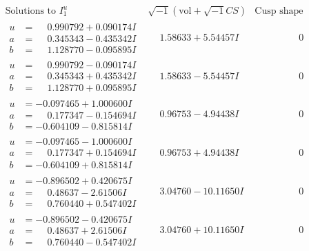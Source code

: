 \documentclass[1p]{elsarticle_modified}
\theoremstyle{definition}
\newcommand{\I}{\sqrt{-1}}
\begin{document}
$$\begin{array}{c|c|c}  
\text{Solutions to }I^u_{1}& \I (\text{vol} + \sqrt{-1}CS) & \text{Cusp shape}\\
 \hline 
\begin{aligned}
u &= \phantom{-}0.990792 + 0.090174 I \\
a &= \phantom{-}0.345343 - 0.435342 I \\
b &= \phantom{-}1.128770 - 0.095895 I\end{aligned}
 & \phantom{-}1.58633 + 5.54457 I & \phantom{-0.000000 } 0 \\ \hline\begin{aligned}
u &= \phantom{-}0.990792 - 0.090174 I \\
a &= \phantom{-}0.345343 + 0.435342 I \\
b &= \phantom{-}1.128770 + 0.095895 I\end{aligned}
 & \phantom{-}1.58633 - 5.54457 I & \phantom{-0.000000 } 0 \\ \hline\begin{aligned}
u &= -0.097465 + 1.000600 I \\
a &= \phantom{-}0.177347 - 0.154694 I \\
b &= -0.604109 - 0.815814 I\end{aligned}
 & \phantom{-}0.96753 - 4.94438 I & \phantom{-0.000000 } 0 \\ \hline\begin{aligned}
u &= -0.097465 - 1.000600 I \\
a &= \phantom{-}0.177347 + 0.154694 I \\
b &= -0.604109 + 0.815814 I\end{aligned}
 & \phantom{-}0.96753 + 4.94438 I & \phantom{-0.000000 } 0 \\ \hline\begin{aligned}
u &= -0.896502 + 0.420675 I \\
a &= \phantom{-}0.48637 - 2.61506 I \\
b &= \phantom{-}0.760440 + 0.547402 I\end{aligned}
 & \phantom{-}3.04760 - 10.11650 I & \phantom{-0.000000 } 0 \\ \hline\begin{aligned}
u &= -0.896502 - 0.420675 I \\
a &= \phantom{-}0.48637 + 2.61506 I \\
b &= \phantom{-}0.760440 - 0.547402 I\end{aligned}
 & \phantom{-}3.04760 + 10.11650 I & \phantom{-0.000000 } 0 \\ \hline\begin{aligned}

\end{aligned}
\end{array}$$
\end{document}
